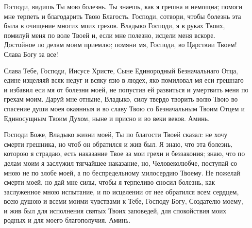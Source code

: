 \mychapterending

 


Господи, видишь Ты мою болезнь. Ты знаешь, как я грешна и немощна; помоги мне терпеть и благодарить Твою Благость. Господи, сотвори, чтобы болезнь эта была в очищение многих моих грехов. Владыко Господи, я в руках Твоих, помилуй меня по воле Твоей и, если мне полезно, исцели меня вскоре. Достойное по делам моим приемлю; помяни мя, Господи, во Царствии Твоем! Слава Богу за все!





\mychapterending

 


Слава Тебе, Господи, Иисусе Христе, Сыне Единородный Безначальнаго Отца, едине изцеляяй всяк недуг и всяку язю в людех, яко помиловал мя еси грешнаго и избавил еси мя от болезни моей, не попустив ей развиться и умертвить меня по грехам моим. Даруй мне отныне, Владыко, силу твердо творить волю Твою во спасение души моея окаянныя и во славу Твою со Безначальным Твоим Отцем и Единосущным Твоим Духом, ныне и присно и во веки веков. Аминь.





\mychapterending

 


Господи Боже, Владыко жизни моей, Ты по благости Твоей сказал: не хочу смерти грешника, но чтоб он обратился и жив был. Я знаю, что эта болезнь, которою я страдаю, есть наказание Твое за мои грехи и беззакония; знаю, что по делам моим я заслужил тягчайшее наказание, но, Человеколюбче, поступай со мною не по злобе моей, а по беспредельному милосердию Твоему. Не пожелай смерти моей, но дай мне силы, чтобы я терпеливо сносил болезнь, как заслуженное мною испытание, и по исцелении от нее обратился всем сердцем, всею душою и всеми моими чувствами к Тебе, Господу Богу, Создателю моему, и жив был для исполнения святых Твоих заповедей, для спокойствия моих родных и для моего благополучия. Аминь. 





